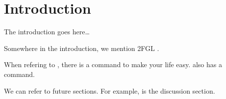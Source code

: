 \section{Introduction}

The introduction goes here\ldots

Somewhere in the introduction, we mention 2FGL \citep{second_lat_catalog}.

When refering to \lat, there is a \lat command to make your life easy.
\fermi also has a command.

We can refer to future sections. For example,  is the discussion section.
